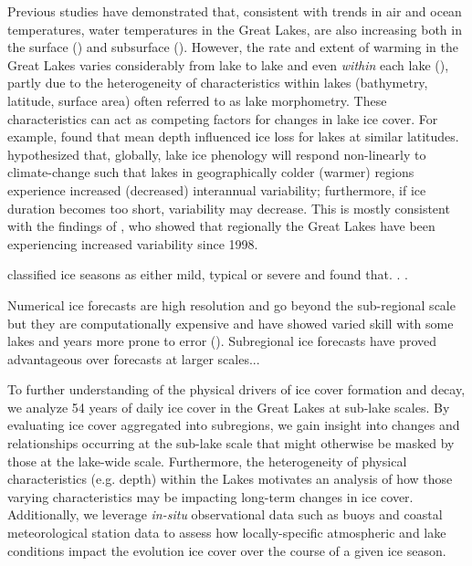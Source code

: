 \documentclass{article}
\begin{document}
Previous studies have demonstrated that, consistent with trends in air and ocean temperatures, water temperatures in the Great Lakes, are also increasing both in the surface (\cite{Austin_2007, OReilly_2015, Zhong_2018, Woolway_2018}) and subsurface (\cite{Anderson_2021, Cannon_2024}). However, the rate and extent of warming in the Great Lakes varies considerably from lake to lake and even \emph{within} each lake (\cite{Mason_2016}), partly due to the heterogeneity of characteristics within lakes (bathymetry, latitude, surface area) often referred to as lake morphometry. These characteristics can act as competing factors for changes in lake ice cover.  For example, \textcite{Sharma_2019} found that mean depth influenced ice loss for lakes at similar latitudes. \textcite{Richardson_2024} hypothesized that, globally, lake ice phenology will respond non-linearly to climate-change such that lakes in geographically colder (warmer) regions experience increased (decreased) interannual variability; furthermore, if ice duration becomes too short, variability may decrease. This is mostly consistent with the findings of \textcite{Lin_2022}, who showed that regionally the Great Lakes have been experiencing increased variability since 1998. 

\textcite{Assel_2005} classified ice seasons as either mild, typical or severe and found that. . .

Numerical ice forecasts are high resolution and go beyond the sub-regional scale but they are computationally expensive and have showed varied skill with some lakes and years more prone to error (\cite{Anderson_2018}). 
Subregional ice forecasts \cite{Venumuddula_2024} have proved advantageous over forecasts at larger scales...



To further understanding of the physical drivers of ice cover formation and decay, we analyze 54 years of daily ice cover in the Great Lakes at sub-lake scales. By evaluating ice cover aggregated into subregions, we gain insight into changes and relationships occurring at the sub-lake scale that might otherwise be masked by those at the lake-wide scale. Furthermore, the heterogeneity of physical characteristics (e.g. depth) within the Lakes motivates an analysis of how those varying characteristics may be impacting long-term changes in ice cover. Additionally, we leverage \emph{in-situ} observational data such as buoys and coastal meteorological station data to assess how locally-specific atmospheric and lake conditions impact the evolution ice cover over the course of a given ice season.
\end{document}
